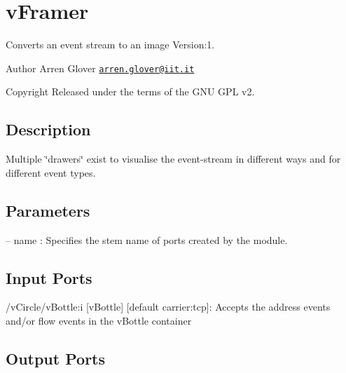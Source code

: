 \hypertarget{group__vFramer}{}\section{v\+Framer}
\label{group__vFramer}
Converts an event stream to an image Version\+:1. \begin{DoxyAuthor}{Author}
Arren Glover \href{mailto:arren.glover@iit.it}{\tt arren.\+glover@iit.\+it} ~\newline
 
\end{DoxyAuthor}
\begin{DoxyCopyright}{Copyright}
Released under the terms of the G\+NU G\+PL v2. 
\end{DoxyCopyright}
\hypertarget{group__zynqGrabber_intro_sec}{}\subsection{Description}\label{group__zynqGrabber_intro_sec}
Multiple \char`\"{}drawers\char`\"{} exist to visualise the event-\/stream in different ways and for different event types.\hypertarget{group__zynqGrabber_parameters_sec}{}\subsection{Parameters}\label{group__zynqGrabber_parameters_sec}

\begin{DoxyItemize}
\item -- name \+: Specifies the stem name of ports created by the module. 
\end{DoxyItemize}\hypertarget{group__zynqGrabber_inputports_sec}{}\subsection{Input Ports}\label{group__zynqGrabber_inputports_sec}

\begin{DoxyItemize}
\item /v\+Circle/v\+Bottle\+:i \mbox{[}v\+Bottle\mbox{]} \mbox{[}default carrier\+:tcp\mbox{]}\+: Accepts the address events and/or flow events in the v\+Bottle container
\end{DoxyItemize}\hypertarget{group__zynqGrabber_outputports_sec}{}\subsection{Output Ports}\label{group__zynqGrabber_outputports_sec}

